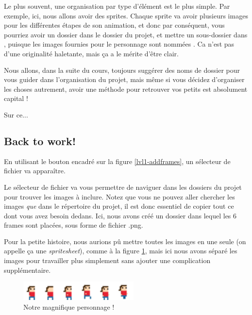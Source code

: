 Le plus souvent, une organisation par type d'élément est le plus simple. Par exemple, ici, nous allons avoir des sprites. Chaque sprite va avoir plusieurs images pour les différentes étapes de son animation, et donc par conséquent, vous pourriez avoir un dossier  dans le dossier du projet, et mettre un sous-dossier  dans , puisque les images fournies pour le personnage sont nommées . Ca n'est pas d'une originalité haletante, mais ça a le mérite d'être clair.

Nous allons, dans la suite du cours, toujours suggérer des noms de dossier pour vous guider dans l'organisation du projet, mais même si vous décidez d'organiser les choses autrement, avoir une méthode pour retrouver vos petits est absolument capital !

Sur ce...

\subsection{Back to work!}

En utilisant le bouton encadré sur la figure \ref{lvl1-addframes}, un sélecteur de fichier va apparaître.

Le sélecteur de fichier va vous permettre de naviguer dans les dossiers du projet pour trouver les images à inclure. Notez que vous ne pouvez aller chercher les images \emph{que} dans le répertoire du projet, il est donc essentiel de copier tout ce dont vous avez besoin dedans. Ici, nous avons créé un dossier  dans lequel les 6 frames sont placées, sous forme de fichier .png.

Pour la petite histoire, nous aurions pû mettre toutes les images en une seule (on appelle ça une \emph{spritesheet}), comme à la figure \ref{lvl1-spritesheet}, mais ici nous avons séparé les images pour travailler plus simplement sans ajouter une complication supplémentaire.

\begin{figure}
  \begin{center}
    \includegraphics[width=6cm]{img/lvl1-spritesheet.png}
  \end{center}
  \caption{\label{lvl1-spritesheet} Notre magnifique personnage !}
\end{figure}

